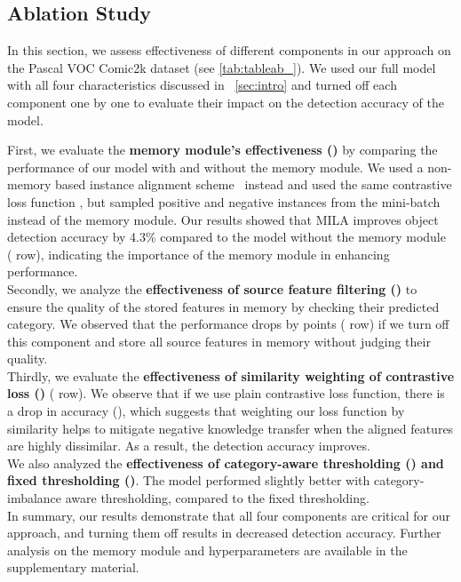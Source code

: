 \documentclass{bmvc2k}
\begin{document}
\subsection{Ablation Study}\label{sec:ablation}
In this section, we assess effectiveness of different components in our approach on the Pascal VOC  Comic2k dataset (see \cref{tab:tableab_}). We used our full model with all four characteristics discussed in ~\cref{sec:intro} and turned off each component one by one to evaluate their impact on the detection accuracy of the model.

First, we evaluate the \textbf{memory module's effectiveness ()} by comparing the performance of our model with and without the memory module. We used a non-memory based instance alignment scheme~\cite{xu2020cross} instead and used the same contrastive loss function , but sampled positive and negative instances from the mini-batch instead of the memory module. Our results showed that MILA improves object detection accuracy by 4.3\% compared to the model without the memory module ( row), indicating the importance of the memory module in enhancing performance. \\
Secondly, we analyze the \textbf{effectiveness of source feature filtering ()} to ensure the quality of the stored features in memory by checking their predicted category. We observed that the performance drops by  points ( row) if we turn off this component and store all source features in memory without judging their quality.
\\
Thirdly, we evaluate the \textbf{effectiveness of similarity weighting of contrastive loss ()} ( row). We observe that if we use plain contrastive loss function, there is a drop in accuracy (), which suggests that weighting our loss function by similarity helps to mitigate negative knowledge transfer when the aligned features are highly dissimilar. As a result, the detection accuracy improves.
\\
We also analyzed the \textbf{effectiveness of category-aware thresholding () and fixed thresholding ()}. The model performed slightly better with category-imbalance aware thresholding, compared to the fixed thresholding. \\
In summary, our results demonstrate that all four components are critical for our approach, and turning them off results in decreased detection accuracy. Further analysis on the memory module and hyperparameters are available in the supplementary material.
\end{document}

